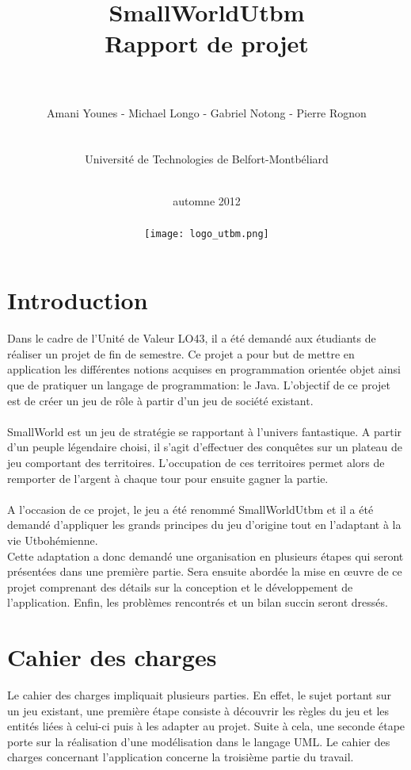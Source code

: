 \documentclass[a4paper, 11pt]{article}
\title{\vspace{5cm}SmallWorldUtbm \\ Rapport de projet \\ \ \\}
\date{automne 2012\\ \ \\ \vspace*{3cm}
	\texttt{[image: logo\_utbm.png]}
	}
\author{Amani Younes - Michael Longo - Gabriel Notong - Pierre Rognon \\ \ \\ \ \\ Université de Technologies de Belfort-Montbéliard\\ \ \\}
\begin{document}
	
	\maketitle
	
	\newpage
	
	
	\newpage
	
	\section*{Introduction}
	
	Dans le cadre de l'Unité de Valeur LO43, il a été demandé aux étudiants de réaliser un projet de fin de semestre. Ce projet a pour but de mettre en application les différentes notions acquises en programmation orientée objet ainsi que de pratiquer un langage de programmation: le Java. L'objectif de ce projet est de créer un jeu de rôle à partir d'un jeu de société existant.
	\paragraph{} SmallWorld est un jeu de stratégie se rapportant à l'univers fantastique. A partir d'un peuple légendaire choisi, il s'agit d'effectuer des conquêtes sur un plateau de jeu comportant des territoires. L'occupation de ces territoires permet alors de remporter de l'argent à chaque tour pour ensuite gagner la partie. 
	\paragraph{}A l'occasion de ce projet, le jeu a été renommé SmallWorldUtbm et il a été demandé d'appliquer les grands principes du jeu d'origine tout en l'adaptant à la vie Utbohémienne. \\
	Cette adaptation a donc demandé une organisation en plusieurs étapes qui seront présentées dans une première partie. Sera ensuite abordée la mise en œuvre de ce projet comprenant des détails sur la conception et le développement de l'application. Enfin, les problèmes rencontrés et un bilan succin seront dressés.
	
	
	\newpage
	
	\section{Cahier des charges}
	
	Le cahier des charges impliquait plusieurs parties. En effet, le sujet portant sur un jeu existant, une première étape consiste à découvrir les règles du jeu et les entités liées à celui-ci puis à les adapter au projet. Suite à cela, une seconde étape porte sur la réalisation d'une modélisation dans le langage UML. Le cahier des charges concernant l'application concerne la troisième partie du travail.
	
\end{document}

